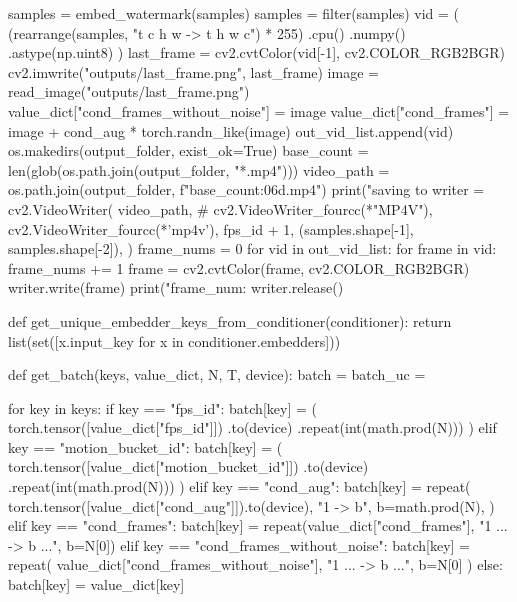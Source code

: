                     samples = embed_watermark(samples)
                    samples = filter(samples)
                    vid = (
                        (rearrange(samples, "t c h w -> t h w c") * 255)
                        .cpu()
                        .numpy()
                        .astype(np.uint8)
                    )
                    last_frame = cv2.cvtColor(vid[-1], cv2.COLOR_RGB2BGR)
                    cv2.imwrite("outputs/last_frame.png", last_frame)
                    image = read_image("outputs/last_frame.png")
                    value_dict["cond_frames_without_noise"] = image
                    value_dict["cond_frames"] = image + cond_aug * torch.randn_like(image)
                    out_vid_list.append(vid)
                os.makedirs(output_folder, exist_ok=True)
                base_count = len(glob(os.path.join(output_folder, "*.mp4")))
                video_path = os.path.join(output_folder, f"{base_count:06d}.mp4")
                print("saving to %
                writer = cv2.VideoWriter(
                    video_path,
                    # cv2.VideoWriter_fourcc(*"MP4V"),
                    cv2.VideoWriter_fourcc(*'mp4v'),
                    fps_id + 1,
                    (samples.shape[-1], samples.shape[-2]),
                )
                frame_nums = 0
                for vid in out_vid_list:
                    for frame in vid:
                        frame_nums += 1
                        frame = cv2.cvtColor(frame, cv2.COLOR_RGB2BGR)
                        writer.write(frame)
                print("frame_num: %
                writer.release()


def get_unique_embedder_keys_from_conditioner(conditioner):
    return list(set([x.input_key for x in conditioner.embedders]))


def get_batch(keys, value_dict, N, T, device):
    batch = {}
    batch_uc = {}

    for key in keys:
        if key == "fps_id":
            batch[key] = (
                torch.tensor([value_dict["fps_id"]])
                .to(device)
                .repeat(int(math.prod(N)))
            )
        elif key == "motion_bucket_id":
            batch[key] = (
                torch.tensor([value_dict["motion_bucket_id"]])
                .to(device)
                .repeat(int(math.prod(N)))
            )
        elif key == "cond_aug":
            batch[key] = repeat(
                torch.tensor([value_dict["cond_aug"]]).to(device),
                "1 -> b",
                b=math.prod(N),
            )
        elif key == "cond_frames":
            batch[key] = repeat(value_dict["cond_frames"], "1 ... -> b ...", b=N[0])
        elif key == "cond_frames_without_noise":
            batch[key] = repeat(
                value_dict["cond_frames_without_noise"], "1 ... -> b ...", b=N[0]
            )
        else:
            batch[key] = value_dict[key]

